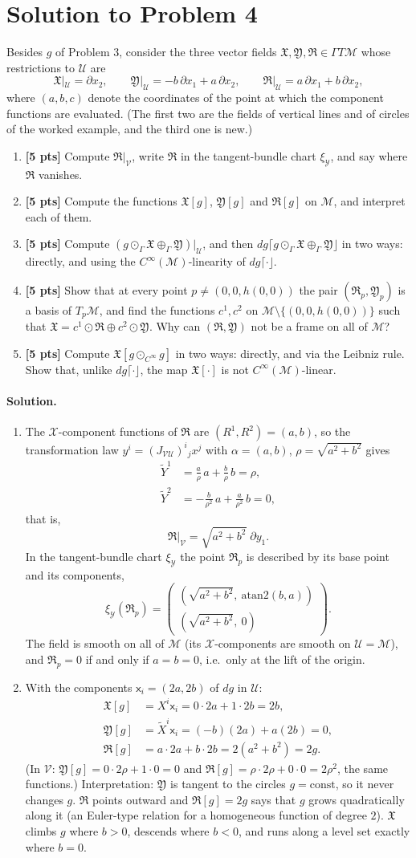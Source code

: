 \documentclass[11pt]{article}
\newcommand{\probFour}{%
Besides $g$ of Problem 3, consider the three vector fields $\mathfrak X,\mathfrak Y,\mathfrak R\in\Gamma T\mathcal M$ whose restrictions to $\mathcal U$ are
\[
\mathfrak X|_{\mathcal U}=\partial x_2,\qquad
\mathfrak Y|_{\mathcal U}=-b\,\partial x_1+a\,\partial x_2,\qquad
\mathfrak R|_{\mathcal U}=a\,\partial x_1+b\,\partial x_2,
\]
where $(a,b,c)$ denote the coordinates of the point at which the component functions are evaluated.
(The first two are the fields of vertical lines and of circles of the worked example, and the third one is new.)
\begin{enumerate}[label=(\alph*)]
\item \textbf{[5 pts]} Compute $\mathfrak R|_{\mathcal V}$, write $\mathfrak R$ in the tangent-bundle chart $\xi_{\mathcal Y}$, and say where $\mathfrak R$ vanishes.
\item \textbf{[5 pts]} Compute the functions $\mathfrak X[g]$, $\mathfrak Y[g]$ and $\mathfrak R[g]$ on $\mathcal M$, and interpret each of them.
\item \textbf{[5 pts]} Compute $(g\odot_\Gamma\mathfrak X\oplus_\Gamma\mathfrak Y)|_{\mathcal U}$, and then $dg\lceil g\odot_\Gamma\mathfrak X\oplus_\Gamma\mathfrak Y\rfloor$
in two ways: directly, and using the $C^\infty(\mathcal M)$-linearity of $dg\lceil\cdot\rfloor$.
\item \textbf{[5 pts]} Show that at every point $p\neq(0,0,h(0,0))$ the pair $(\mathfrak R_p,\mathfrak Y_p)$ is a basis of $T_p\mathcal M$, and
find the functions $c^1,c^2$ on $\mathcal M\setminus\{(0,0,h(0,0))\}$ such that $\mathfrak X=c^1\odot\mathfrak R\oplus c^2\odot\mathfrak Y$. Why can $(\mathfrak R,\mathfrak Y)$ not
be a frame on all of $\mathcal M$?
\item \textbf{[5 pts]} Compute $\mathfrak X[g\odot_{C^\infty} g]$ in two ways: directly, and via the Leibniz rule. Show that, unlike $dg\lceil\cdot\rfloor$, the map
$\mathfrak X[\cdot]$ is not $C^\infty(\mathcal M)$-linear.
\end{enumerate}}
\begin{document}
\section*{Solution to Problem 4}
\probFour

\paragraph{Solution.}
\begin{enumerate}[label=(\alph*)]
\item The $\mathcal X$-component functions of $\mathfrak R$ are $(R^1,R^2)=(a,b)$, so the transformation law $y^i=(J_{\mathcal{VU}})^i{}_jx^j$ with
$\alpha=(a,b)$, $\rho=\sqrt{a^2+b^2}$ gives
\begin{align*}
\tilde Y^1&=\frac a\rho\,a+\frac b\rho\,b=\rho,\\
\tilde Y^2&=-\frac b{\rho^2}\,a+\frac a{\rho^2}\,b=0,
\end{align*}
that is,
\[
\mathfrak R|_{\mathcal V}=\sqrt{a^2+b^2}\;\partial y_1.
\]
In the tangent-bundle chart $\xi_{\mathcal Y}$ the point $\mathfrak R_p$ is described by its base point and its components,
\[
\xi_{\mathcal Y}(\mathfrak R_p)=\begin{pmatrix}(\sqrt{a^2+b^2},\ \mathrm{atan2}(b,a))\\ (\sqrt{a^2+b^2},\ 0)\end{pmatrix}.
\]
The field is smooth on all of $\mathcal M$ (its $\mathcal X$-components are smooth on $\mathcal U=\mathcal M$), and $\mathfrak R_p=0$ if and only if $a=b=0$, i.e.\ only at the lift of the origin.
\item With the components $\mathsf x_i=(2a,2b)$ of $dg$ in $\mathcal U$:
\begin{align*}
\mathfrak X[g]&=X^i\mathsf x_i=0\cdot2a+1\cdot2b=2b,\\
\mathfrak Y[g]&=\tilde X^i\mathsf x_i=(-b)(2a)+a(2b)=0,\\
\mathfrak R[g]&=a\cdot2a+b\cdot2b=2(a^2+b^2)=2g.
\end{align*}
(In $\mathcal V$: $\mathfrak Y[g]=0\cdot2\rho+1\cdot0=0$ and $\mathfrak R[g]=\rho\cdot2\rho+0\cdot0=2\rho^2$, the same functions.)
Interpretation: $\mathfrak Y$ is tangent to the circles $g=\mathrm{const}$, so it never changes $g$. $\mathfrak R$ points outward and $\mathfrak R[g]=2g$ says that $g$ grows
quadratically along it (an Euler-type relation for a homogeneous function of degree $2$). $\mathfrak X$ climbs $g$ where $b>0$, descends where $b<0$, and runs along a level set exactly where $b=0$.

\end{enumerate}
\end{document}
